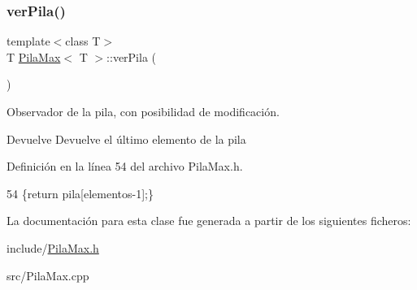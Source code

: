 \subsubsection{\texorpdfstring{ver\+Pila()}{verPila()}}
{\footnotesize\ttfamily template$<$class T$>$ \\
T \mbox{\hyperlink{classPilaMax}{Pila\+Max}}$<$ T $>$\+::ver\+Pila (\begin{DoxyParamCaption}{ }\end{DoxyParamCaption})\hspace{0.3cm}{\ttfamily [inline]}}



Observador de la pila, con posibilidad de modificación. 

\begin{DoxyReturn}{Devuelve}
Devuelve el último elemento de la pila 
\end{DoxyReturn}


Definición en la línea 54 del archivo Pila\+Max.\+h.


\begin{DoxyCode}
54 \{\textcolor{keywordflow}{return} pila[elementos-1];\}
\end{DoxyCode}


La documentación para esta clase fue generada a partir de los siguientes ficheros\+:\begin{DoxyCompactItemize}
\item 
include/\mbox{\hyperlink{PilaMax_8h}{Pila\+Max.\+h}}\item 
src/Pila\+Max.\+cpp\end{DoxyCompactItemize}
